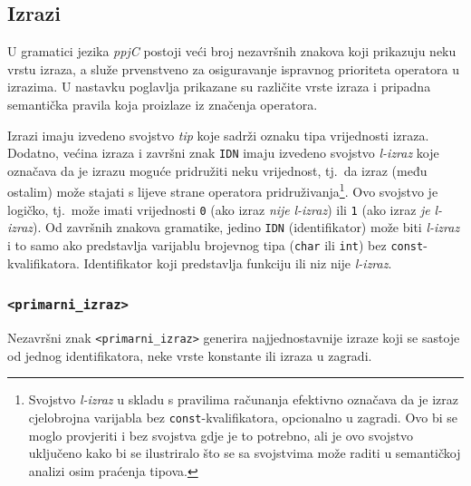 \documentclass[times, 12pt, utf8]{book}
\begin{document}
\subsection{Izrazi}
U gramatici jezika \emph{ppjC} postoji veći broj nezavršnih znakova koji prikazuju neku vrstu izraza, a služe prvenstveno za osiguravanje ispravnog prioriteta operatora u izrazima.
U nastavku poglavlja prikazane su različite vrste izraza i pripadna semantička pravila koja proizlaze iz značenja operatora.

Izrazi imaju izvedeno svojstvo \emph{tip} koje sadrži oznaku tipa vrijednosti izraza.
Dodatno, većina izraza i završni znak \verb|IDN| imaju izvedeno svojstvo \emph{l-izraz} koje označava da je izrazu moguće pridružiti neku vrijednost, tj.~da izraz (među ostalim) može stajati s lijeve strane operatora pridruživanja\footnote{Svojstvo \emph{l-izraz} u skladu s pravilima računanja efektivno označava da je izraz cjelobrojna varijabla bez \texttt{const}-kvalifikatora, opcionalno u zagradi. Ovo bi se moglo provjeriti i bez svojstva gdje je to potrebno, ali je ovo svojstvo uključeno kako bi se ilustriralo što se sa svojstvima može raditi u semantičkoj analizi osim praćenja tipova.}.
Ovo svojstvo je logičko, tj.~može imati vrijednosti \verb|0| (ako izraz \emph{nije} \emph{l-izraz}) ili \verb|1| (ako izraz \emph{je} \emph{l-izraz}).
Od završnih znakova gramatike, jedino \verb|IDN| (identifikator) može biti \emph{l-izraz} i to samo ako predstavlja varijablu brojevnog tipa (\verb|char| ili \verb|int|) bez \verb|const|-kvalifikatora.
Identifikator koji predstavlja funkciju ili niz nije \emph{l-izraz}.

\subsubsection{\texttt{<primarni\_izraz>}}

Nezavršni znak \verb|<primarni_izraz>| generira najjednostavnije izraze koji se sastoje od jednog identifikatora, neke vrste konstante ili izraza u zagradi.
\end{document}
